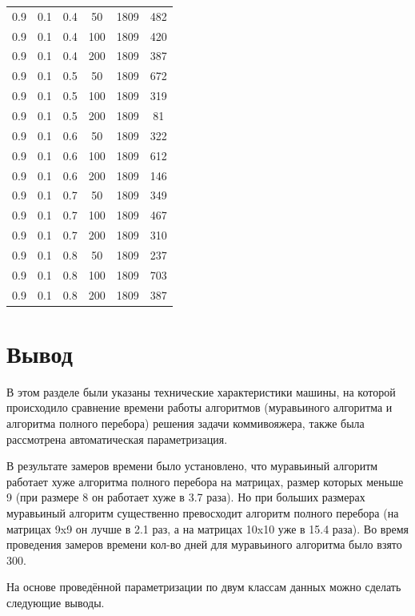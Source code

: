 \documentclass[a4paper,14pt, unknownkeysallowed]{extreport}
\begin{document}
\begin{center}
\begin{longtable}[c]{|c|c|c|c|c|c|}
	   \hline
		0.9 &  0.1 &  0.4 &   50 &  1809 &   482 \\
		0.9 &  0.1 &  0.4 &  100 &  1809 &   420 \\
		0.9 &  0.1 &  0.4 &  200 &  1809 &   387 \\
	   \hline
		0.9 &  0.1 &  0.5 &   50 &  1809 &   672 \\
		0.9 &  0.1 &  0.5 &  100 &  1809 &   319 \\
		0.9 &  0.1 &  0.5 &  200 &  1809 &    81 \\
	   \hline
		0.9 &  0.1 &  0.6 &   50 &  1809 &   322 \\
		0.9 &  0.1 &  0.6 &  100 &  1809 &   612 \\
		0.9 &  0.1 &  0.6 &  200 &  1809 &   146 \\
	   \hline
		0.9 &  0.1 &  0.7 &   50 &  1809 &   349 \\
		0.9 &  0.1 &  0.7 &  100 &  1809 &   467 \\
		0.9 &  0.1 &  0.7 &  200 &  1809 &   310 \\
	   \hline
		0.9 &  0.1 &  0.8 &   50 &  1809 &   237 \\
		0.9 &  0.1 &  0.8 &  100 &  1809 &   703 \\
		0.9 &  0.1 &  0.8 &  200 &  1809 &   387 \\
	   \hline	   
\end{longtable}
\end{center}

\clearpage

\section{Вывод}

В этом разделе были указаны технические характеристики машины, на которой происходило сравнение времени работы алгоритмов (муравьиного алгоритма и алгоритма полного перебора) решения задачи коммивояжера, также была рассмотрена автоматическая параметризация.

В результате замеров времени было установлено, что муравьиный алгоритм работает хуже алгоритма полного перебора на матрицах, размер которых меньше 9 (при размере 8 он работает хуже в 3.7 раза). Но при больших размерах муравьиный алгоритм существенно превосходит алгоритм полного перебора (на матрицах 9x9 он лучше в 2.1 раз, а на матрицах 10x10 уже в 15.4 раза). Во время проведения замеров времени кол-во дней для муравьиного алгоритма было взято 300.

На основе проведённой параметризации по двум классам данных можно сделать следующие выводы.
\end{document}
